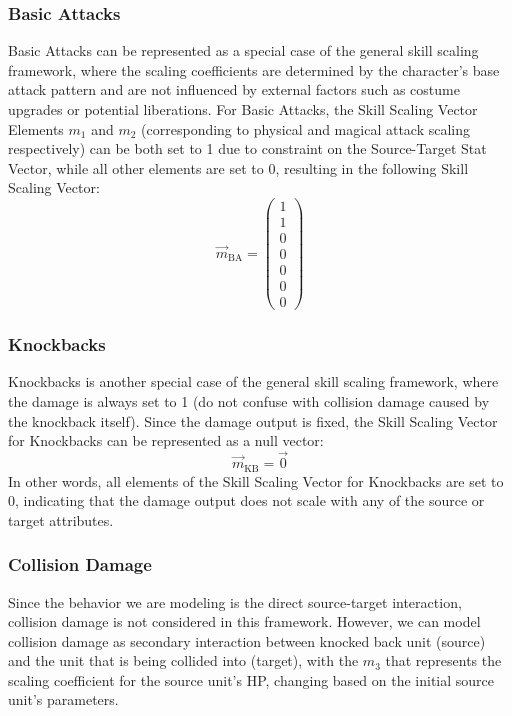 \documentclass[twocolumn,10pt]{article}
\begin{document}
\subsubsection{Basic Attacks}
Basic Attacks can be represented as a special case of the general skill scaling framework, where the scaling coefficients are determined by the character's base attack pattern and are not influenced by external factors such as costume upgrades or potential liberations. For Basic Attacks, the Skill Scaling Vector Elements $m_1$ and $m_2$ (corresponding to physical and magical attack scaling respectively) can be both set to 1 due to constraint on the Source-Target Stat Vector, while all other elements are set to 0, resulting in the following Skill Scaling Vector:
\begin{equation}
  \vec{m}_{\text{BA}} = \begin{pmatrix} 
  1 \\ 
  1 \\ 
  0 \\ 
  0 \\ 
  0 \\ 
  0 \\ 
  0 
  \end{pmatrix}
\end{equation}

\subsubsection{Knockbacks}
Knockbacks is another special case of the general skill scaling framework, where the damage is always set to 1 (do not confuse with collision damage caused by the knockback itself). Since the damage output is fixed, the Skill Scaling Vector for Knockbacks can be represented as a null vector:
\begin{equation}
  \vec{m}_{\text{KB}} = \vec{0}
\end{equation}
In other words, all elements of the Skill Scaling Vector for Knockbacks are set to 0, indicating that the damage output does not scale with any of the source or target attributes.

\subsubsection{Collision Damage}
Since the behavior we are modeling is the direct source-target interaction, collision damage is not considered in this framework. However, we can model collision damage as secondary interaction between knocked back unit (source) and the unit that is being collided into (target), with the $m_3$ that represents the scaling coefficient for the source unit's HP, changing based on the initial source unit's parameters.
\end{document}
